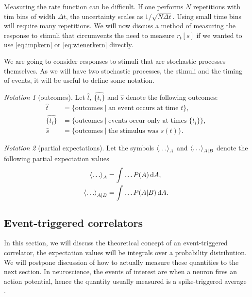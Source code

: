 \documentclass[12pt]{article}
\theoremstyle{slplain}
\theoremstyle{sldefinition}
\theoremstyle{remark}
\newtheorem*{notn}{Notation}
\begin{document}
Measuring the rate function can be difficult. If one performs $N$ repetitions with tim bins of width $\Delta t$, the uncertainty scales as $1/\sqrt{N\Delta t}$. Using small time bins will require many repetitions. We will now discuss a method of measuring the response to stimuli that circumvents the need to measure $r_t[s]$ if we wanted to use \eqref{eq:impkern} or \eqref{eq:wienerkern} directly.

We are going to consider responses to stimuli that are stochastic processes themselves. As we will have two stochastic processes, the stimuli and the timing of events, it will be useful to define some notation.

\begin{notn}[outcomes]
  Let $\hat{t}$, $\widehat{\{t_i\}}$ and $\hat{s}$ denote the following outcomes:
  \begin{equation}\label{eq:outcomes}
    \begin{aligned}
      \hat{t} &= \{ \text{outcomes} \mid \text{an event occurs at time } t  \} , \\
      \widehat{\{t_i\}} &= \{ \text{outcomes} \mid \text{events occur only at times } \{t_i\}  \} , \\
      \hat{s} &= \{ \text{outcomes} \mid \text{the stimulus was } s(t)  \} .
    \end{aligned}
  \end{equation}
\end{notn}

\begin{notn}[partial expectations]
  Let the symbols $\left\langle \ldots \right\rangle_A$ and $\left\langle \ldots \right\rangle_{A|B}$ denote the following partial expectation values
  \begin{equation}\label{eq:partialexp}
    \begin{aligned}
      \left\langle \ldots \right\rangle_A &= \int\ldots P(A)\,\mathrm{d} A, \\
      \left\langle \ldots \right\rangle_{A|B} &= \int\ldots P(A|B)\,\mathrm{d} A.
    \end{aligned}
  \end{equation}
\end{notn}

\subsection{Event-triggered correlators}\label{sec:evtrigcorr}

In this section, we will discuss the theoretical concept of an event-triggered correlator, \ie the expectation values will be integrals over a probability distribution. We will postpone discussion of how to actually measure these quantities to the next section. In neuroscience, the events of interest are when a neuron fires an action potential, hence the quantity usually measured is a spike-triggered average \cite{DayanAbbot:2001,deBoerKuyper:1968}.
\end{document}
